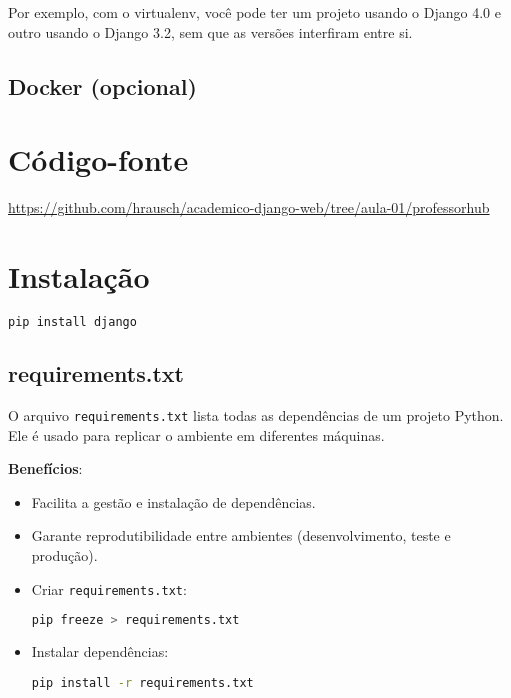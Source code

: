 Por exemplo, com o virtualenv, voc\^{e} pode ter um projeto usando o Django 4.0 e outro usando o Django 3.2, sem que as vers\~oes interfiram entre si.

\subsection*{Docker (opcional)}

\section{C\'odigo-fonte}
\href{https://github.com/hrausch/academico-django-web/tree/aula-01/professorhub}{https://github.com/hrausch/academico-django-web/tree/aula-01/professorhub}

\section{Instala\c{c}\~ao}

\begin{lstlisting}[language=bash]
pip install django
\end{lstlisting}

\subsection{requirements.txt}
O arquivo \texttt{requirements.txt} lista todas as depend\^{e}ncias de um projeto Python. Ele \'{e} usado para replicar o ambiente em diferentes m\'aquinas.

\textbf{Benef\'icios}:
\begin{itemize}
    \item Facilita a gest\~ao e instala\c{c}\~ao de depend\^{e}ncias.
    \item Garante reprodutibilidade entre ambientes (desenvolvimento, teste e produ\c{c}\~ao).
\end{itemize}

\begin{itemize}
  \item Criar \texttt{requirements.txt}:
\begin{lstlisting}[language=bash]
pip freeze > requirements.txt
\end{lstlisting}

  \item Instalar depend\^{e}ncias:
\begin{lstlisting}[language=bash]
pip install -r requirements.txt
\end{lstlisting}
\end{itemize}

